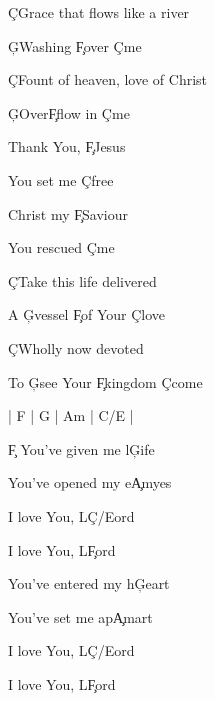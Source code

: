 \documentclass[9pt]{extarticle}
\begin{document}
\bsong

\bv
\c{C}Grace that flows like a river

\c{G}Washing \c{F}over \c{C}me

\c{C}Fount of heaven, love of Christ

\c{G}Over\c{F}flow in \c{C}me
\ev

\bc
Thank You, \c{F}Jesus

You set me \c{C}free

Christ my \c{F}Saviour

You rescued \c{C}me
\ec

\bv
\c{C}Take this life delivered

A \c{G}vessel \c{F}of Your \c{C}love

\c{C}Wholly now devoted

To \c{G}see Your \c{F}kingdom \c{C}come
\ev


\bin
| F | G | Am |  C/E  |
\ein

\bb[2]
\c{F} You've given me l\c{G}ife

You've opened my e\c{Am}yes

I love You, L\c{C/E}ord

I love You, L\c{F}ord

You've entered my h\c{G}eart

You've set me ap\c{Am}art

I love You, L\c{C/E}ord

I love You, L\c{F}ord
\eb




\esong
\end{document}
